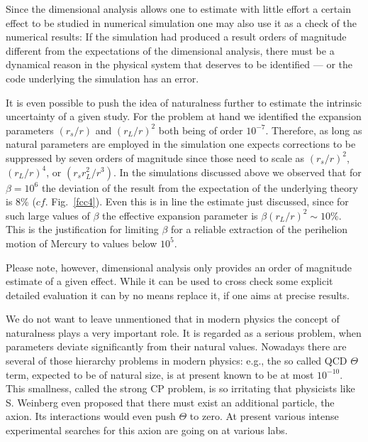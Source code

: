 \documentclass[12pt,ngerman,american]{iopart}
\begin{document}
Since the dimensional analysis allows one to estimate with little effort a certain effect to be studied in numerical simulation
one may also use it as a check of the numerical results: If the simulation had produced a result orders of magnitude different
from the expectations of the dimensional analysis, there must be a dynamical reason in the physical system that deserves to be identified --- or the code underlying the simulation has an error. 

It is even possible to push the idea of naturalness further to estimate the intrinsic uncertainty of a given study. 
For the problem at hand we identified the expansion parameters $(r_s/r)$ and $(r_L/r)^2$ both being of order $10^{-7}$.
Therefore, as long as natural parameters are employed in the simulation one expects corrections to be suppressed by
seven orders of magnitude since those need to scale as $(r_s/r)^2$, $(r_L/r)^4$, or $(r_s r_L^2/r^3)$.
In the simulations discussed above we observed that for $\beta=10^6$ the deviation of the result from the expectation
of the underlying theory is 8\% ($cf$. Fig.~\ref{fcc4}). Even this is in line the estimate just discussed, since 
for such large values of $\beta$ the effective expansion parameter is $\beta(r_L/r)^2\sim 10$\%. This is the 
justification for limiting $\beta$ for a reliable extraction of the perihelion motion of Mercury to values below $10^5$.

Please note, however, dimensional analysis only provides an order of magnitude estimate of a given effect. 
While it can be used to cross check some explicit detailed evaluation it can by no means replace it, if one
aims at precise results.

We do not want to leave unmentioned that in modern physics the concept of naturalness plays a very important role. 
It is regarded as a serious problem, when parameters deviate significantly from their natural values. 
Nowadays there are  several of those hierarchy problems in modern physics: e.g., the so called QCD $\Theta$ term, 
expected to be of natural size, is at present known to be at most $10^{-10}$.
This smallness, called the strong CP problem, is so irritating that physicists like S. Weinberg even proposed that there must exist an additional particle, the axion.
Its interactions would even push $\Theta$ to zero.
At present various intense experimental searches for this axion are going on at various labs.



\end{document}
